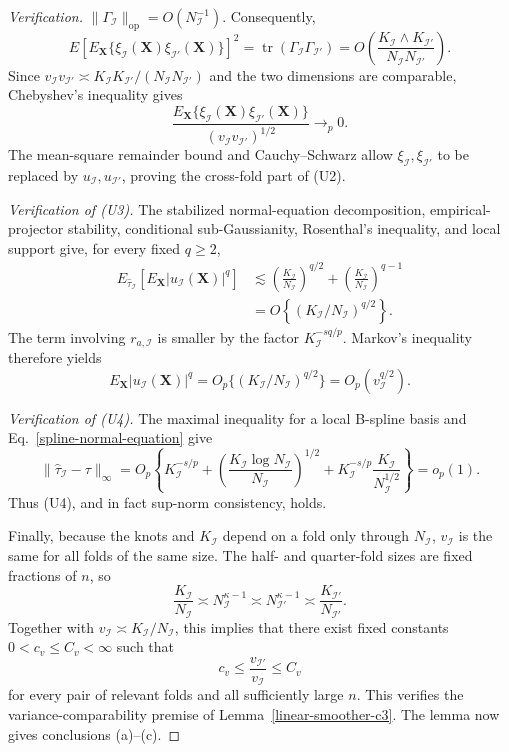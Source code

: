 \documentclass[11pt]{article}
\theoremstyle{referenceplain}
\theoremstyle{referencedefinition}
\theoremstyle{referenceremark}
\begin{document}
\begin{proof}[Verification]
$\|\Gamma_{\mathcal I}\|_{\mathrm{op}}=O(N_{\mathcal I}^{-1})$.
Consequently,
\[
E\left[E_{\mathbf X}\{\xi_{\mathcal I}(\mathbf X)
\xi_{\mathcal I'}(\mathbf X)\}\right]^2
=\operatorname{tr}(\Gamma_{\mathcal I}\Gamma_{\mathcal I'})
=O\left(\frac{K_{\mathcal I}\wedge K_{\mathcal I'}}
{N_{\mathcal I}N_{\mathcal I'}}\right).
\]
Since $v_{\mathcal I}v_{\mathcal I'}\asymp
K_{\mathcal I}K_{\mathcal I'}/(N_{\mathcal I}N_{\mathcal I'})$ and the two dimensions are comparable, Chebyshev's inequality gives
\[
\frac{E_{\mathbf X}\{\xi_{\mathcal I}(\mathbf X)\xi_{\mathcal I'}(\mathbf X)\}}
{(v_{\mathcal I}v_{\mathcal I'})^{1/2}}
\longrightarrow_p0.
\]
The mean-square remainder bound and Cauchy--Schwarz allow
$\xi_{\mathcal I},\xi_{\mathcal I'}$ to be replaced by
$u_{\mathcal I},u_{\mathcal I'}$, proving the cross-fold part of (U2).

\medskip\noindent\textit{Verification of (U3).}
The stabilized normal-equation decomposition, empirical-projector stability,
conditional sub-Gaussianity, Rosenthal's inequality, and local support give,
for every fixed $q\ge2$,
\begin{align*}
E_{\widehat\tau_{\mathcal I}}\left[
E_{\mathbf X}|u_{\mathcal I}(\mathbf X)|^q
\right]
&\lesssim
\left(\frac{K_{\mathcal I}}{N_{\mathcal I}}\right)^{q/2}
+\left(\frac{K_{\mathcal I}}{N_{\mathcal I}}\right)^{q-1}\\
&=O\left\{(K_{\mathcal I}/N_{\mathcal I})^{q/2}\right\}.
\end{align*}
The term involving $r_{a,\mathcal I}$ is smaller by the factor
$K_{\mathcal I}^{-sq/p}$. Markov's inequality therefore yields
\[
E_{\mathbf X}|u_{\mathcal I}(\mathbf X)|^q
=O_p\{(K_{\mathcal I}/N_{\mathcal I})^{q/2}\}
=O_p(v_{\mathcal I}^{q/2}).
\]

\medskip\noindent\textit{Verification of (U4).}
The maximal inequality for a local B-spline basis and
Eq.~\eqref{spline-normal-equation} give
\[
\|\widehat\tau_{\mathcal I}-\tau\|_\infty
=O_p\left\{
K_{\mathcal I}^{-s/p}
+\left(\frac{K_{\mathcal I}\log N_{\mathcal I}}{N_{\mathcal I}}\right)^{1/2}
+K_{\mathcal I}^{-s/p}\frac{K_{\mathcal I}}{N_{\mathcal I}^{1/2}}
\right\}=o_p(1).
\]
Thus (U4), and in fact sup-norm consistency, holds.

Finally, because the knots and $K_{\mathcal I}$ depend on a fold only
through $N_{\mathcal I}$, $v_{\mathcal I}$ is the same for all folds of
the same size. The half- and quarter-fold sizes are fixed fractions of $n$,
so
\[
\frac{K_{\mathcal I}}{N_{\mathcal I}}
\asymp N_{\mathcal I}^{\kappa-1}
\asymp N_{\mathcal I'}^{\kappa-1}
\asymp\frac{K_{\mathcal I'}}{N_{\mathcal I'}}.
\]
Together with
$v_{\mathcal I}\asymp K_{\mathcal I}/N_{\mathcal I}$, this implies that
there exist fixed constants $0<c_v\le C_v<\infty$ such that
\[
c_v
\le \frac{v_{\mathcal I'}}{v_{\mathcal I}}
\le C_v
\]
for every pair of relevant folds and all sufficiently large $n$. This
verifies the variance-comparability premise of
Lemma~\ref{linear-smoother-c3}. The lemma now gives conclusions (a)--(c).
\end{proof}
\end{document}
